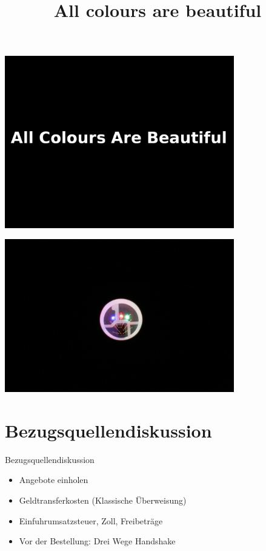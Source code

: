\documentclass{beamer}
\title{All colours are beautiful}
\institute{MetaMeute}
\begin{document}
\beamertemplatenavigationsymbolsempty
{}



{

\begin{frame}
 \centering
 \includegraphics[width=10cm,keepaspectratio=true]{./title_because_gnxtr_sucks_at_beamer.png}
\end{frame}


\begin{frame}
 \centering
 \includegraphics[width=10cm,keepaspectratio=true]{./img/_MG_4513.JPG}
\end{frame}

}
\section{Bezugsquellendiskussion}
\begin{frame}{Bezugsquellendiskussion}
\begin{itemize}
 \item Angebote einholen
 \item Geldtransferkosten (Klassische Überweisung)
 \item Einfuhrumsatzsteuer, Zoll, Freibeträge
 \item Vor der Bestellung: Drei Wege Handshake
\end{itemize}
\end{frame}
\end{document}
